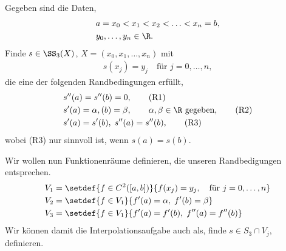 \begin{bemn}[Interpolationsaufgabe.]
Gegeben sind die Daten,
\begin{align*}
&a=x_0 < x_1 < x_2 < \ldots < x_n = b,\\
&y_0,\ldots,y_n\in\R.
\end{align*}
Finde $s\in\SS_3(X)$, $X=(x_0,x_1,\ldots,x_n)$ mit
\begin{align*}
s(x_j) = y_j\quad\text{für }j=0,\ldots,n,
\end{align*}
die eine der folgenden Randbedingungen erfüllt,
\begin{align*}
&s''(a) = s''(b) = 0,\tag{R1}\\
&s'(a) = \alpha, (b) = \beta,\qquad \alpha,\beta\in\R \text{ gegeben},\tag{R2}\\
&s'(a) = s'(b),\; s''(a) = s''(b),\tag{R3}
\end{align*}
wobei (R3) nur sinnvoll ist, wenn $s(a) = s(b)$.
\end{bemn}
Wir wollen nun Funktionenräume definieren, die unseren Randbedigungen
entsprechen.
\begin{align*}
&V_1 = \setdef{f\in C^2([a,b])}{f(x_j)=y_j,\quad\text{für }j=0,\ldots,n}\\
&V_2 = \setdef{f\in V_1}{f'(a)=\alpha,\; f'(b) = \beta}\\
&V_3 = \setdef{f\in V_1}{f'(a)=f'(b),\; f''(a)=f''(b)}
\end{align*}
Wir können damit die Interpolationsaufgabe auch als,
finde $s\in  S_3\cap V_j$, definieren.

